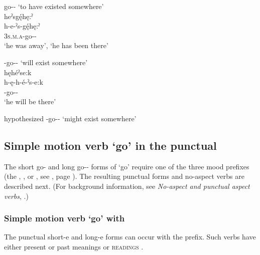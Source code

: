 \ea\label{ex:simplemotex4}  go-{\habitual}-{\past} ‘to have existed somewhere’\\
heˀsgę́hę:ˀ\\
\gll h-e-ˀs-gę́hę:ˀ\\
 \textsc{3s.m.a}-go-{\habitual}-{\past}\\
\glt ‘he was away’, `he has been there'\\
\z


\ea\label{ex:simplemotex5}  \fut-go-{\habitual}-{\modalizer} ‘will exist somewhere’\\
hęhéˀse:k\\
\gll h-ę-h-é-ˀs-e:k\\
 -go-{\habitual}-{\modalizer}\\
\glt `he will be there'
\z


\ea\label{ex:simplemotex6} hypothesized  {\indefinite}-go-{\habitual}-{\modalizer} ‘might exist somewhere’
\z


\subsection{Simple motion verb  ‘go’ in the punctual} \label{ch:Simple motion verb in the punctual}
The short  go-{\punctual} and long  go-{\purposive}-{\punctual} forms of  ‘go’ require one of the three mood prefixes (the  \textsc{\factual},  \textsc{\future}, or  \textsc{\indefinite}, see , page \pageref{figtab:1:purposiveasp}). The resulting punctual forms and no-aspect verbs are described next. (For background information, see \textit{No-aspect and punctual aspect verbs}, .)


\subsubsection*{Simple motion verb  ‘go’ with  \textsc{\factual}}
The punctual short-e  and long-e  forms can occur with the  \textsc{\factual} prefix. Such verbs have either present  or past  meanings or \textsc{readings} .

